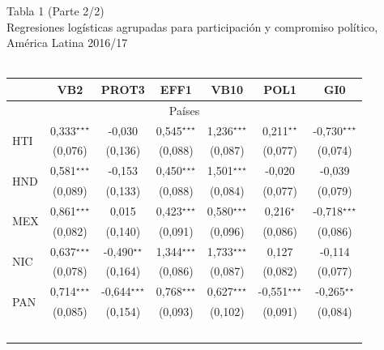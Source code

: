 \documentclass[a4paper]{tufte-handout}
\begin{document}
\begin{table}[h]
  \centering
  \selectfont
   \smallskip\noindent\small Tabla 1 (Parte 2/2) \\ Regresiones logísticas agrupadas para participación y compromiso político, América Latina 2016/17 \\~\\
  \begin{tabular}{l c c c c c c}
    \toprule
     & VB2 & PROT3 & EFF1 & VB10 & POL1 & GI0 \\ \midrule
    \multicolumn{7}{c}{Países} \\ \midrule
    \multirow{2}{*}{HTI} & 0,333$^\star$$^\star$$^\star$ & -0,030 & 0,545$^\star$$^\star$$^\star$ & 1,236$^\star$$^\star$$^\star$ & 0,211$^\star$$^\star$ & -0,730$^\star$$^\star$$^\star$ \\
    & {\scriptsize (0,076)} & {\scriptsize (0,136)} & {\scriptsize (0,088)} & {\scriptsize (0,087)} & {\scriptsize (0,077)} & {\scriptsize (0,074)} \\ 
    \multirow{2}{*}{HND} & 0,581$^\star$$^\star$$^\star$ & -0,153 & 0,450$^\star$$^\star$$^\star$ & 1,501$^\star$$^\star$$^\star$ & -0,020 & -0,039 \\
    & {\scriptsize (0,089)} & {\scriptsize (0,133)} & {\scriptsize (0,088)} & {\scriptsize (0,084)} & {\scriptsize (0,077)} & {\scriptsize (0,079)} \\
    \multirow{2}{*}{MEX} & 0,861$^\star$$^\star$$^\star$ & 0,015 & 0,423$^\star$$^\star$$^\star$ & 0,580$^\star$$^\star$$^\star$ & 0,216$^\star$ & -0,718$^\star$$^\star$$^\star$ \\
    & {\scriptsize (0,082)} & {\scriptsize (0,140)} & {\scriptsize (0,091)} & {\scriptsize (0,096)} & {\scriptsize (0,086)} & {\scriptsize (0,086)}\\
    \multirow{2}{*}{NIC} & 0,637$^\star$$^\star$$^\star$ & -0,490$^\star$$^\star$ & 1,344$^\star$$^\star$$^\star$ & 1,733$^\star$$^\star$$^\star$ & 0,127 & -0,114\\
    & {\scriptsize (0,078)} & {\scriptsize (0,164)} & {\scriptsize (0,086)} & {\scriptsize (0,087)} & {\scriptsize (0,082)} & {\scriptsize (0,077)} \\
    \multirow{2}{*}{PAN} & 0,714$^\star$$^\star$$^\star$ & -0,644$^\star$$^\star$$^\star$ & 0,768$^\star$$^\star$$^\star$ & 0,627$^\star$$^\star$$^\star$ & -0,551$^\star$$^\star$$^\star$ & -0,265$^\star$$^\star$ \\
    & {\scriptsize (0,085)} & {\scriptsize (0,154)} & {\scriptsize (0,093)} & {\scriptsize (0,102)} & {\scriptsize (0,091)} & {\scriptsize (0,084)} \\
$$
\end{tabular}
\end{table}
\end{document}
